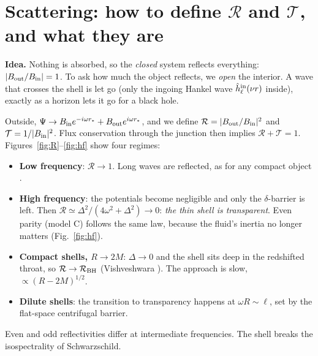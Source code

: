 \documentclass[10pt,a4paper]{article}
\newcommand{\RR}{\mathcal R}
\newcommand{\TT}{\mathcal T}
\newcommand{\idea}[1]{\par\smallskip\noindent\colorbox{idea!8}{\parbox{\dimexpr\linewidth-2\fboxsep}{\small\textbf{\color{idea}Idea.} #1}}\par\smallskip}
\begin{document}
\section{Scattering: how to define $\RR$ and $\TT$, and what they are}
\idea{Nothing is absorbed, so the \emph{closed} system reflects everything: $|B_{\rm out}/B_{\rm in}|=1$. To ask how much
the object reflects, we \emph{open} the interior. A wave that crosses the shell is let go (only the ingoing Hankel wave
$\hat h^{\rm in}_\ell(\nu r)$ inside), exactly as a horizon lets it go for a black hole.}

Outside, $\Psi\to B_{\rm in}e^{-i\omega r_*}+B_{\rm out}e^{i\omega r_*}$, and we define $\RR=|B_{\rm out}/B_{\rm in}|^2$
and $\TT=1/|B_{\rm in}|^2$. Flux conservation through the junction then implies $\RR+\TT=1$. Figures~\ref{fig:R}--\ref{fig:hf}
show four regimes:
\begin{itemize}
\item \textbf{Low frequency}: $\RR\to1$. Long waves are reflected, as for any compact object \cite{Boyanov25}.
\item \textbf{High frequency}: the potentials become negligible and only the $\delta$-barrier is left. Then
$\RR\simeq\Delta^2/(4\omega^2+\Delta^2)\to0$: \emph{the thin shell is transparent}. Even parity (model C) follows the
same law, because the fluid's inertia no longer matters (Fig.~\ref{fig:hf}).
\item \textbf{Compact shells, $R\to2M$}: $\Delta\to0$ and the shell sits deep in the redshifted throat, so
$\RR\to\RR_{\rm BH}$ (Vishveshwara \cite{Vishveshwara70}). The approach is slow, $\propto(R-2M)^{1/2}$.
\item \textbf{Dilute shells}: the transition to transparency happens at $\omega R\sim\ell$, set by the flat-space
centrifugal barrier.
\end{itemize}
Even and odd reflectivities differ at intermediate frequencies. The shell breaks the isospectrality of Schwarzschild.
\end{document}
